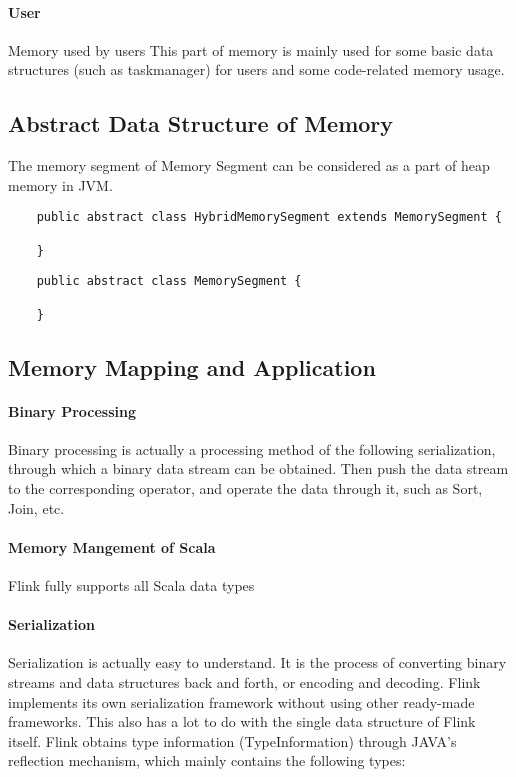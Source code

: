 \paragraph{User}
Memory used by users This part of memory is mainly used for some basic
data structures (such as taskmanager) for users and some code-related
memory usage.

\subsection*{Abstract Data Structure of Memory}
The memory segment of Memory Segment can be considered as a part of
heap memory in JVM.
\begin{lstlisting}
	public abstract class HybridMemorySegment extends MemorySegment {

	}
\end{lstlisting}

\begin{lstlisting}
	public abstract class MemorySegment {

	}
\end{lstlisting}


\subsection*{Memory Mapping and Application}

\paragraph{Binary Processing}
Binary processing is actually a processing method of the following
serialization, through which a binary data stream can be obtained.
Then push the data stream to the corresponding operator, and operate
the data through it, such as Sort, Join, etc.

\paragraph{Memory Mangement of Scala}
Flink fully supports all Scala data types

\paragraph{Serialization}
Serialization is actually easy to understand. It is the process of
converting binary streams and data structures back and forth, or
encoding and decoding.  Flink implements its own serialization
framework without using other ready-made frameworks. This also has a
lot to do with the single data structure of Flink itself. Flink
obtains type information (TypeInformation) through JAVA's reflection
mechanism, which mainly contains the following types:

